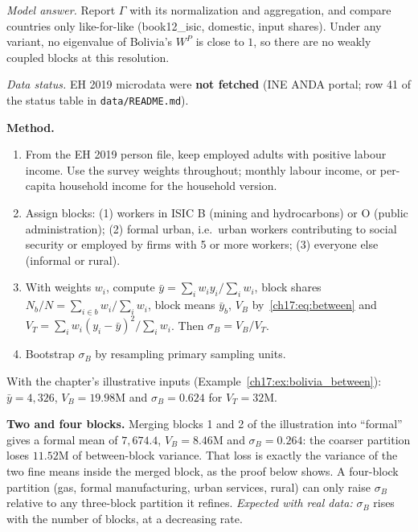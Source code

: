 \documentclass[../solutions_manual.tex]{subfiles}
\begin{document}
\emph{Model answer.} Report $\Gamma$ with its normalization and aggregation, and compare countries only like-for-like (book12\_isic, domestic, input shares). Under any variant, no eigenvalue of Bolivia's $W^P$ is close to $1$, so there are no weakly coupled blocks at this resolution.


\emph{Data status.} EH 2019 microdata were \textbf{not fetched} (INE ANDA portal; row 41 of the status table in \nolinkurl{data/README.md}).

 \textbf{Method.}
\begin{enumerate}
\item From the EH 2019 person file, keep employed adults with positive labour income. Use the survey weights throughout; monthly labour income, or per-capita household income for the household version.
\item Assign blocks: (1) workers in ISIC B (mining and hydrocarbons) or O (public administration); (2) formal urban, i.e.\ urban workers contributing to social security or employed by firms with 5 or more workers; (3) everyone else (informal or rural).
\item With weights $w_i$, compute $\bar y = \sum_i w_iy_i/\sum_i w_i$, block shares $N_b/N = \sum_{i\in b}w_i/\sum_i w_i$, block means $\bar y_b$, $V_B$ by~\eqref{ch17:eq:between} and $V_T = \sum_i w_i(y_i - \bar y)^2/\sum_i w_i$. Then $\sigma_B = V_B/V_T$.
\item Bootstrap $\sigma_B$ by resampling primary sampling units.
\end{enumerate}
With the chapter's illustrative inputs (Example~\ref{ch17:ex:bolivia_between}): $\bar y = 4{,}326$, $V_B = 19.98$M and $\sigma_B = 0.624$ for $V_T = 32$M.

 \textbf{Two and four blocks.} Merging blocks 1 and 2 of the illustration into ``formal'' gives a formal mean of $7{,}674.4$, $V_B = 8.46$M and $\sigma_B = 0.264$: the coarser partition loses $11.52$M of between-block variance. That loss is exactly the variance of the two fine means inside the merged block, as the proof below shows. A four-block partition (gas, formal manufacturing, urban services, rural) can only raise $\sigma_B$ relative to any three-block partition it refines. \emph{Expected with real data:} $\sigma_B$ rises with the number of blocks, at a decreasing rate.
\end{document}
